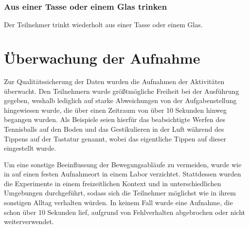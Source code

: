 \subsubsection{Aus einer Tasse oder einem Glas trinken}
Der Teilnehmer trinkt wiederholt aus einer Tasse oder einem Glas.

\section{Überwachung der Aufnahme}
Zur Qualitätssicherung der Daten wurden die Aufnahmen der Aktivitäten überwacht. Den Teilnehmern wurde größtmögliche Freiheit bei der Ausführung gegeben, weshalb lediglich auf starke Abweichungen von der Aufgabenstellung hingewiesen wurde, die über einen Zeitraum von über 10 Sekunden hinweg begangen wurden. Als Beispiele seien hierfür das beabsichtigte Werfen des Tennisballs auf den Boden und das Gestikulieren in der Luft während des Tippens auf der Tastatur genannt, wobei das eigentliche Tippen auf dieser eingestellt wurde.

Um eine sonstige Beeinflussung der Bewegungsabläufe zu vermeiden, wurde wie in  auf einen festen Aufnahmeort in einem Labor verzichtet. Stattdessen wurden die Experimente in einem freizeitlichen Kontext und in unterschiedlichen Umgebungen durchgeführt, sodass sich die Teilnehmer möglichst wie in ihrem sonstigen Alltag verhalten würden. In keinem Fall wurde eine Aufnahme, die schon über 10 Sekunden lief, aufgrund von Fehlverhalten abgebrochen oder nicht weiterverwendet.

